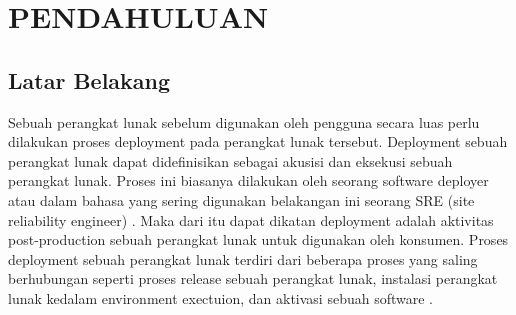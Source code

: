 \chapter{PENDAHULUAN}

\vspace{4.5pt}
\setlength{\parskip}{0.5em}

\section{Latar Belakang} \label{sec:latar_belakang}
Sebuah perangkat lunak sebelum digunakan oleh pengguna secara luas perlu dilakukan proses deployment
pada perangkat lunak tersebut. Deployment sebuah perangkat lunak dapat didefinisikan sebagai akusisi
dan eksekusi sebuah perangkat lunak. Proses ini biasanya dilakukan oleh seorang software deployer atau dalam bahasa yang sering
digunakan belakangan ini seorang SRE (site reliability engineer)  \cite{Lyu2007}.
Maka dari itu dapat dikatan deployment adalah aktivitas post-production sebuah perangkat lunak untuk digunakan oleh konsumen.
Proses deployment sebuah perangkat lunak terdiri dari beberapa proses yang saling berhubungan seperti proses release sebuah perangkat lunak,
instalasi perangkat lunak kedalam environment exectuion, dan aktivasi sebuah software  \cite{Carzaniga1998}.

